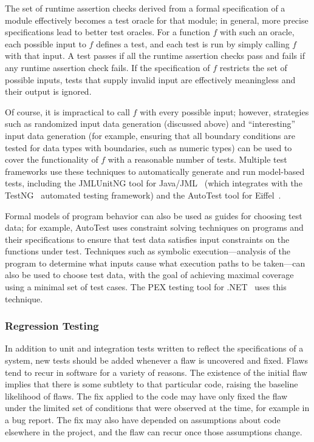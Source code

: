 The set of runtime assertion checks derived from a formal
specification of a module effectively becomes a test oracle for that
module; in general, more precise specifications lead to better test
oracles. For a function $f$ with such an oracle, each possible input
to $f$ defines a test, and each test is run by simply calling $f$ with
that input. A test passes if all the runtime assertion checks pass and
fails if any runtime assertion check fails. If the specification of
$f$ restricts the set of possible inputs, tests that supply invalid
input are effectively meaningless and their output is ignored.

Of course, it is impractical to call $f$ with every possible input;
however, strategies such as randomized input data generation
(discussed above) and ``interesting'' input data generation (for
example, ensuring that all boundary conditions are tested for data
types with boundaries, such as numeric types) can be used to cover the
functionality of $f$ with a reasonable number of tests. Multiple test
frameworks use these techniques to automatically generate and run
model-based tests, including the JMLUnitNG tool for
Java/JML~\cite{ZimmermanNagmoti10} (which integrates with the
TestNG~\cite{TestNG} automated testing framework) and the AutoTest
tool for Eiffel~\cite{AutoTest10}.

Formal models of program behavior can also be used as guides for
choosing test data; for example, AutoTest uses constraint solving
techniques on programs and their specifications to ensure that test
data satisfies input constraints on the functions under test.
Techniques such as symbolic execution---analysis of the program to
determine what inputs cause what execution paths to be taken---can
also be used to choose test data, with the goal of achieving maximal
coverage using a minimal set of test cases. The PEX testing tool for
.NET~\cite{PEX08} uses this technique.

\subsubsection{Regression Testing}

In addition to unit and integration tests written to reflect the
specifications of a system, new tests should be added whenever a flaw
is uncovered and fixed. Flaws tend to recur in software for a variety
of reasons. The existence of the initial flaw implies that there is
some subtlety to that particular code, raising the baseline likelihood
of flaws. The fix applied to the code may have only fixed the flaw
under the limited set of conditions that were observed at the time,
for example in a bug report. The fix may also have depended on
assumptions about code elsewhere in the project, and the flaw can
recur once those assumptions change.

